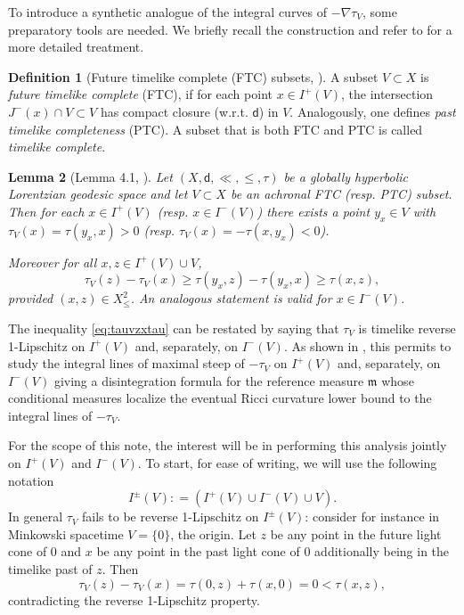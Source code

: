 \documentclass[a4paper,10pt]{article}
\newcommand{\mm}{\mathfrak m}
\newcommand{\sfd}{\mathsf d}
\theoremstyle{plain}
\newtheorem{lemma}{Lemma}[section]
\theoremstyle{definition}
\newtheorem{definition}[lemma]{Definition}
\numberwithin{equation}{section}
\begin{document}
To introduce a synthetic analogue of the integral curves of $-\nabla \tau_{V}$, some preparatory tools are needed. 
We briefly recall the construction and refer to \cite[Sec.]{CaMo:20} for a more detailed treatment.

\begin{definition}[Future timelike complete (FTC) subsets, \cite{gallowayFTC}]\label{def:FTC}
A subset $V\subset X$ is \emph{future timelike complete} (FTC), if for each point  $x\in I^{+}(V)$, the intersection $J^{-}(x)\cap V \subset V$ has compact closure (w.r.t. $\sfd$) in $V$. Analogously, one defines \emph{past timelike completeness} (PTC). A subset that is both   FTC and PTC is called \emph{timelike complete}.
\end{definition}




\begin{lemma}[Lemma 4.1, \cite{CaMo:20}]\label{L:initialpoint} 
Let $(X,\sfd, \ll, \leq, \tau)$ be a globally hyperbolic Lorentzian geodesic  space and let $V\subset X$ be an achronal FTC (resp. PTC) subset. Then  for each $x\in I^{+}(V)$ (resp. $x\in I^{-}(V)$) there exists a point $y_{x}\in V$ with $\tau_{V}(x)=\tau(y_{x},x)>0$ (resp. $\tau_{V}(x)=-\tau(x,y_{x})<0$).

Moreover for all $x,z\in I^{+}(V)\cup V$,
%
\begin{equation}\label{eq:tauvzxtau}
\tau_{V}(z) - \tau_{V}(x) \geq \tau(y_{x},z)-\tau(y_{x},x)  \geq  \tau(x,z), 
\end{equation}
%
provided $(x,z) \in X^{2}_{\leq}$. An analogous statement is valid for 
$x\in I^{-}(V)$.
\end{lemma}

The inequality \eqref{eq:tauvzxtau} can be restated by saying that $\tau_V$ is timelike reverse 1-Lipschitz on $I^+(V)$ and, separately,  
on $I^-(V)$. As shown in \cite{cavalletti2024sharpisoperimetrictypeinequalitylorentzian}, this permits to study the integral lines of maximal steep of $-\tau_V$ on $I^+(V)$ and, separately, on $I^-(V)$ giving a disintegration formula for the reference measure  
$\mm$ whose conditional measures localize the eventual Ricci curvature lower bound to the integral lines of $-\tau_V$. 

For the scope of this note, the interest will be in performing this analysis jointly on 
$I^+(V)$ and $I^-(V)$. 
To start, for ease of writing, we will use the following notation  
$$
 I^{\pm}(V)  : = (I^{+}(V)\cup I^{-}(V)\cup V).
 $$
In general $\tau_V$ fails to be reverse 1-Lipschitz on $I^\pm(V)$: consider for instance 
in Minkowski spacetime $V= \{0\}$, the origin. Let $z$ be any point in the future light cone of $0$ and $x$ be any point in the past light cone of $0$ additionally being in the timelike past of $z$. Then 
$$\tau_V(z)-\tau_V(x)=\tau(0,z)+\tau(x,0)=0<\tau(x,z),$$  contradicting the reverse 1-Lipschitz property. 
\end{document}
